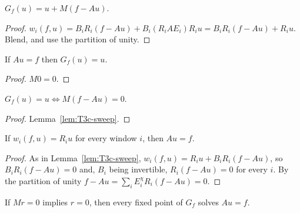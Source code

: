 \begin{lemma}\label{lem:T3c-sweep}
  \leanok
  $G_f(u)=u+M(f-Au)$.
\end{lemma}

\begin{proof}
  \leanok
  $w_i(f,u)=B_iR_i(f-Au)+B_i(R_iAE_i)R_iu=B_iR_i(f-Au)+R_iu$.  Blend, and use
  the partition of unity.
\end{proof}

\begin{theorem}[T3c, consistency]\label{thm:T3c-consistency}
  \leanok
  If $Au=f$ then $G_f(u)=u$.
\end{theorem}

\begin{proof}
  \leanok
  $M0=0$.
\end{proof}

\begin{lemma}\label{lem:T3c-iff}
  \leanok
  $G_f(u)=u\iff M(f-Au)=0$.
\end{lemma}

\begin{proof}
  \leanok
  Lemma~\ref{lem:T3c-sweep}.
\end{proof}

\begin{theorem}[T3c, agreement]\label{thm:T3c-agree}
  \leanok
  If $w_i(f,u)=R_iu$ for every window $i$, then $Au=f$.
\end{theorem}

\begin{proof}
  \leanok
  As in Lemma~\ref{lem:T3c-sweep}, $w_i(f,u)=R_iu+B_iR_i(f-Au)$, so
  $B_iR_i(f-Au)=0$ and, $B_i$ being invertible, $R_i(f-Au)=0$ for every $i$.
  By the partition of unity $f-Au=\sum_iE^\chi_iR_i(f-Au)=0$.
\end{proof}

\begin{theorem}\label{thm:T3c-precond}
  \leanok
  If $Mr=0$ implies $r=0$, then every fixed point of $G_f$ solves $Au=f$.
\end{theorem}

